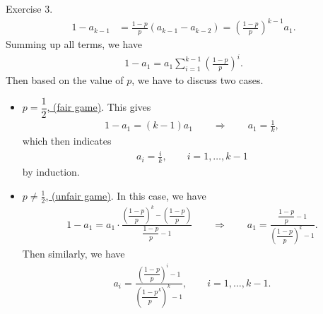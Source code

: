 \documentclass[hyperref={pdfpagelabels=false}]{beamer}
\begin{document}
\begin{frame}[allowframebreaks]{Exercise 3.}
\begin{align*}
        1 - a_{k-1} & = \frac{1-p}{p}(a_{k-1} - a_{k-2}) = \left(\frac{1-p}{p} \right)^{k-1} a_1.
    \end{align*}
    Summing up all terms, we have
    \begin{align*}
        1 - a_1 = a_1 \sum_{i=1}^{k-1} \left(\frac{1-p}{p} \right)^i.
    \end{align*}
    Then based on the value of $p$, we have to discuss two cases.
    \begin{itemize}
    	\item \underline{$p = \dfrac{1}{2}$, (fair game)}. This gives
    	\begin{align*}
    	    1 - a_1 = (k-1)a_1\qquad\Rightarrow\qquad a_1 = \frac{1}{k},
    	\end{align*}
    	which then indicates
    	\begin{align*}
    	    a_i = \frac{i}{k}, \qquad i = 1, \ldots, k-1
    	\end{align*}
    	by induction.
    	\item \underline{$p\neq \frac{1}{2}$, (unfair game)}. In this case, we have
    	\begin{align*}
    	    1 - a_1 = a_1\cdot \frac{\left(\dfrac{1-p}{p} \right)^k - \left(\dfrac{1-p}{p} \right)}{\dfrac{1-p}{p} - 1} \qquad \Rightarrow \qquad a_1 = \frac{\dfrac{1-p}{p} - 1}{\left(\dfrac{1-p}{p} \right)^k - 1}.
    	\end{align*}
    	Then similarly, we have
    	\begin{align*}
    	    a_i = \frac{\left(\dfrac{1-p}{p} \right)^i - 1}{\left(\dfrac{1-p}{p}^k \right)^k - 1}, \qquad i = 1, \ldots, k-1.
    	\end{align*}
    \end{itemize}
\end{frame}
\end{document}

